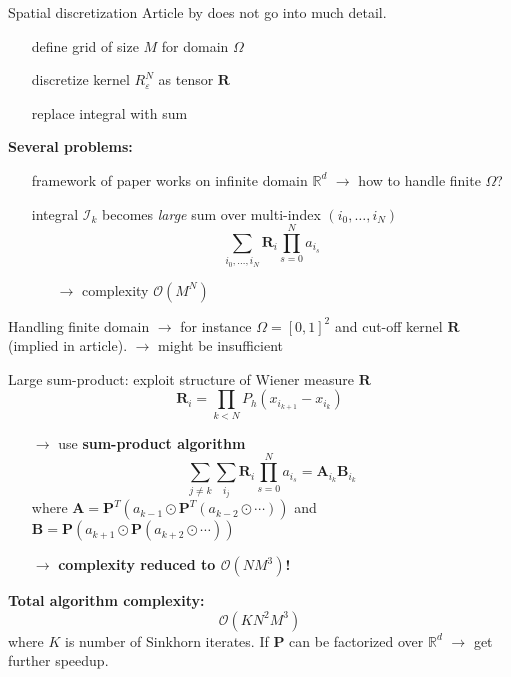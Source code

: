 \documentclass[xcolor={dvipsnames}]{beamer}
\newcommand{\RR}{\mathbb{R}}
\newcommand{\bfR}{\mathbf{R}}
\newcommand{\bfP}{\mathbf{P}}
\newcommand{\calI}{\mathcal{I}}
\newcommand{\calO}{\mathcal{O}}
\renewcommand{\epsilon}{\varepsilon}
\newcommand{\redfont}{\color{darkred}}
\newcommand{\greenfont}{\color{Green!90!black}}
\begin{document}
\begin{frame}{Spatial discretization}
	Article by \textcite{benamou2018entropy} does not go into much detail.
	\begin{itemize}
		\item[\textbullet] define grid of size $M$ for domain $\Omega$
		\item[\textbullet] discretize kernel $R^N_\epsilon$ as tensor $\bfR$
		\item[\textbullet] replace integral with sum
	\end{itemize}
	
	\pause\textbf{\redfont Several problems:}
	\begin{itemize}
		\item[\textbullet] framework of paper works on infinite domain $\RR^d$ $\rightarrow$ how to handle finite $\Omega$?
		\item[\textbullet] integral $\calI_k$ becomes \textit{large} sum over multi-index $(i_0,\ldots,i_N)$
		\[
			\sum_{i_0,\ldots,i_N} \bfR_i \prod_{s=0}^N a_{i_s}
		\]
		\begin{itemize}
			\item[$\rightarrow$] \redfont complexity $\calO(M^N)$
		\end{itemize}
	\end{itemize}
	
\end{frame}

\begin{frame}[allowframebreaks]
	Handling finite domain $\rightarrow$ for instance $\Omega = [0,1]^2$ and cut-off kernel $\bfR$ (implied in article).
	{\redfont $\rightarrow$ might be insufficient}
	
	Large sum-product: exploit structure of Wiener measure $\bfR$
	\[
		\bfR_i = \prod_{k<N} P_h(x_{i_{k+1}} - x_{i_k})
	\]\pause
	\begin{itemize}
		\item[$\rightarrow$] use \textbf{sum-product algorithm}
		\[
		\sum_{j\neq k}\sum_{i_j} \bfR_i \prod_{s=0}^N a_{i_s} =
		\mathbf{A}_{i_k} \mathbf{B}_{i_k}
		\]
		where $\mathbf{A} = \bfP^T(a_{k-1} \odot \bfP^T(a_{k-2}\odot\cdots))$ and $\mathbf{B} = \bfP(a_{k+1} \odot \bfP (a_{k+2}\odot\cdots))$
		\item[$\rightarrow$] {\boldmath\bfseries\greenfont complexity reduced to $\calO(NM^3)$!}
	\end{itemize}
\end{frame}

\begin{frame}
	\textbf{Total algorithm complexity:} 
	\[
		\calO(K N^2 M^3)
	\]
	where $K$ is number of Sinkhorn iterates. If $\bfP$ can be factorized over $\RR^d$ $\rightarrow$ get further speedup.
	
\end{frame}
\end{document}
